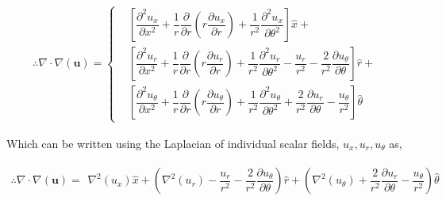 \documentclass{kthreport}
\begin{document}
\begin{eqnarray}
	\therefore \nabla\cdot\nabla (\bm{u}) = \left\{
	\begin{split}
		& \left[\dfrac{\partial^{2}u_{x}}{\partial x^{2}} + \dfrac{1}{r}\dfrac{\partial }{\partial r}\left(r\dfrac{\partial u_{x}}{\partial r}\right) +  \dfrac{1}{r^{2}}\dfrac{\partial^{2} u_{x}}{\partial \theta^{2}}	\right]\hat{x} + \\
		& \left[\dfrac{\partial^{2}u_{r}}{\partial x^{2}} + \dfrac{1}{r}\dfrac{\partial }{\partial r}\left(r\dfrac{\partial u_{r}}{\partial r}\right) +\dfrac{1}{r^{2}}\dfrac{\partial^{2} u_{r}}{\partial \theta^{2}} - \dfrac{u_{r}}{r^{2}} - \dfrac{2}{r^{2}}\dfrac{\partial u_{\theta}}{\partial \theta}  \right]\hat{r}  +\\
		& \left[\dfrac{\partial^{2}u_{\theta}}{\partial x^{2}} + \dfrac{1}{r}\dfrac{\partial }{\partial r}\left(r\dfrac{\partial u_{\theta}}{\partial r}\right) + \dfrac{1}{r^{2}}\dfrac{\partial^{2} u_{\theta}}{\partial \theta^{2}} + \dfrac{2}{r^{2}}\dfrac{\partial u_{r}}{\partial \theta}   - \dfrac{u_{\theta}}{r^{2}} \right]\hat{\theta}  
	\end{split}\right. \label{eqn:vector_laplacian}
\end{eqnarray}

Which can be written using the Laplacian of individual scalar fields, $u_{x},u_{r},u_{\theta}$ as,

\begin{eqnarray}
	\therefore \nabla\cdot\nabla (\bm{u}) = 
\begin{split}
	 \nabla^{2}(u_{x}) \hat{x} + \left(\nabla^{2}(u_{r}) - \dfrac{u_{r}}{r^{2}} - \dfrac{2}{r^{2}}\dfrac{\partial u_{\theta}}{\partial \theta}  \right)\hat{r}  + 
	 \left( \nabla^{2}(u_{\theta}) + \dfrac{2}{r^{2}}\dfrac{\partial u_{r}}{\partial \theta}   - \dfrac{u_{\theta}}{r^{2}} \right)\hat{\theta}  
\end{split} \label{eqn:vector_laplacian_scalar}
\end{eqnarray}
\end{document}
